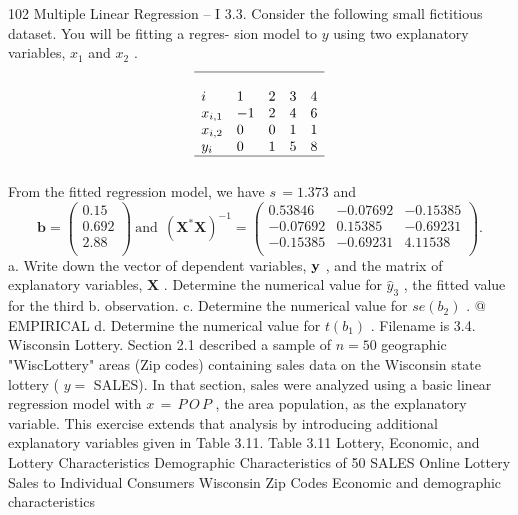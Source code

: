 \documentclass[11pt]{article}
\begin{document}
102 Multiple Linear Regression -- I
3.3. Consider the following small fictitious dataset. You will be fitting a regres-
 sion model to \(y\) using two explanatory variables, \(x_{1}\) and \(x_{2}\) .
\[
\begin{array} {l l l l l} \hline{} & {} & {} & {} & {} \\ {i} & {1} & {2} & {3} & {4} \\ {x_{i , 1}} & {-1} & {2} & {4} & {6} \\ {x_{i , 2}} & {0} & {0} & {1} & {1} \\ {y_{i}} & {0} & {1} & {5} & {8} \\ \hline{} \\ \end{array}
\]
From the fitted regression model, we have \(s \,=1 . 3 7 3\) and
\[
\mathbf{b}=\left( \begin{matrix} {0 . 1 5} \\ {0 . 6 9 2} \\ {2 . 8 8} \\ \end{matrix} \right) \mathrm{~ a n d ~} \ \left( \mathbf{X}^{*} \mathbf{X} \right)^{-1}=\left( \begin{matrix} {0 . 5 3 8 4 6} & {-0 . 0 7 6 9 2} & {-0 . 1 5 3 8 5} \\ {-0 . 0 7 6 9 2} & {0 . 1 5 3 8 5} & {-0 . 6 9 2 3 1} \\ {-0 . 1 5 3 8 5} & {-0 . 6 9 2 3 1} & {4 . 1 1 5 3 8} \\ \end{matrix} \right) .
\]
a. Write down the vector of dependent variables, \({\bf y}\) , and the matrix of
 explanatory variables, \(\mathbf{X}\) .
Determine the numerical value for \(\widehat{y}_{3}\) , the fitted value for the third
b.
observation.
 c. Determine the numerical value for \(s e ( b_{2} )\) .
@ EMPIRICAL d. Determine the numerical value for \(t ( b_{1} )\) .
Filename is 3.4. Wisconsin Lottery. Section 2.1 described a sample of \(n=5 0\) geographic
"WiscLottery" areas (Zip codes) containing sales data on the Wisconsin state lottery ( \(y=\)
 SALES). In that section, sales were analyzed using a basic linear regression
 model with \(x \,=\, P \, O \, P\) , the area population, as the explanatory variable.
 This exercise extends that analysis by introducing additional explanatory
 variables given in Table 3.11.
Table 3.11 Lottery,
Economic, and Lottery Characteristics
Demographic
Characteristics of 50 SALES Online Lottery Sales to Individual Consumers
Wisconsin Zip Codes
Economic and demographic characteristics
\end{document}
